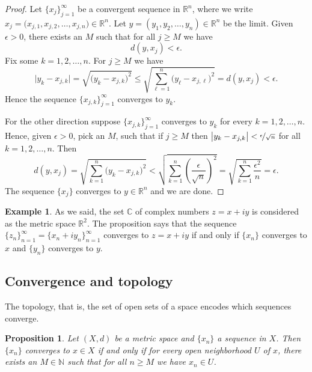 \documentclass[12pt]{book}
\newcommand{\C}{{\mathbb{C}}}
\newcommand{\R}{{\mathbb{R}}}
\newcommand{\N}{{\mathbb{N}}}
\theoremstyle{plain}
\newtheorem{prop}[thm]{Proposition}
\theoremstyle{remark}
\theoremstyle{definition}
\theoremstyle{exercise}
\theoremstyle{example}
\newtheorem{example}[thm]{Example}
\begin{document}
\begin{proof}
Let $\{ x_j \}_{j=1}^\infty$ be a convergent sequence
in $\R^n$, where we write $x_j = \bigl(x_{j,1},x_{j,2},\ldots,x_{j,n}\bigr) \in \R^n$.
Let $y = (y_1,y_2,\ldots,y_n) \in \R^n$ be the limit.
Given $\epsilon > 0$, there exists an $M$ such that for all
$j \geq M$ we have
\begin{equation*}
d(y,x_j) < \epsilon.
\end{equation*}
Fix some $k=1,2,\ldots,n$.  For $j \geq M$ we have
\begin{equation*}
\bigl\lvert y_k - x_{j,k} \bigr\rvert
=
\sqrt{{\bigl(y_k - x_{j,k} \bigr)}^2}
\leq
\sqrt{\sum_{\ell=1}^n {\bigl(y_\ell-x_{j,\ell}\bigr)}^2}
= d(y,x_j) < \epsilon .
\end{equation*}
Hence the sequence $\{ x_{j,k} \}_{j=1}^\infty$ converges to $y_k$.

For the other direction suppose 
$\{ x_{j,k} \}_{j=1}^\infty$ converges to $y_k$ for every $k=1,2,\ldots,n$.
Hence, given $\epsilon > 0$, pick an $M$, such that if $j \geq M$ then 
$\bigl\lvert y_k-x_{j,k} \bigr\rvert < \nicefrac{\epsilon}{\sqrt{n}}$ for all
$k=1,2,\ldots,n$.  Then
\begin{equation*}
d(y,x_j)
=
\sqrt{\sum_{k=1}^n {\bigl(y_k-x_{j,k}\bigr)}^2}
<
\sqrt{\sum_{k=1}^n {\left(\frac{\epsilon}{\sqrt{n}}\right)}^2}
=
\sqrt{\sum_{k=1}^n \frac{{\epsilon^2}}{n}}
= \epsilon .
\end{equation*}
The sequence $\{ x_j \}$ converges to $y \in \R^n$ and we are done.
\end{proof}

\begin{example}
As we said, the set $\C$ of complex numbers $z = x+iy$ is considered 
as the metric space $\R^2$.  The proposition says that the
sequence $\{ z_n \}_{n=1}^\infty = \{ x_n + iy_n \}_{n=1}^\infty$ converges
to $z = x+iy$
if and only if $\{ x_n \}$ converges to $x$ and 
$\{ y_n \}$ converges to $y$.
\end{example}

\subsection{Convergence and topology}

The topology, that is, the set of open sets of a space encodes which
sequences converge.

\begin{prop} \label{prop:msconvtopo}
Let $(X,d)$ be a metric space and $\{x_n\}$ a sequence in $X$.  Then
$\{ x_n \}$ converges to $x \in X$ if and only if for every open neighborhood
$U$ of $x$, there exists an $M \in \N$ such that for all $n \geq M$
we have $x_n \in U$.
\end{prop}
\end{document}
